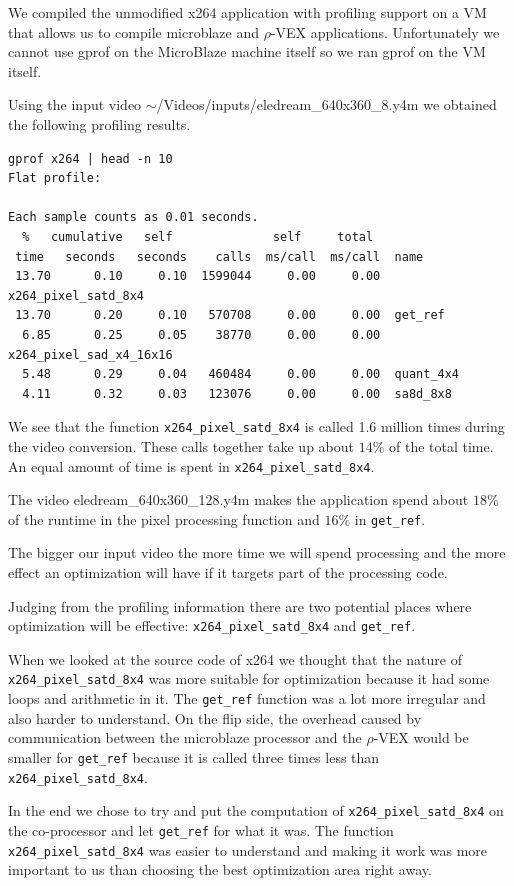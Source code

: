 \documentclass{article}
\newcommand{\rvex}{\ensuremath{\rho}-VEX}
\newcommand{\satd}{\texttt{x264\_pixel\_satd\_8x4}}
\newcommand{\getref}{\texttt{get\_ref}}
\begin{document}
We compiled the unmodified x264 application with profiling support on a VM that
allows us to compile microblaze and \rvex{} applications.
Unfortunately we
cannot use gprof on the MicroBlaze machine itself so we ran gprof on the VM
itself.

Using the input video $\sim$/Videos/inputs/eledream\_640x360\_8.y4m we obtained
the following profiling results.

\begin{small}
\begin{lstlisting}
gprof x264 | head -n 10
Flat profile:

Each sample counts as 0.01 seconds.
  %   cumulative   self              self     total
 time   seconds   seconds    calls  ms/call  ms/call  name
 13.70      0.10     0.10  1599044     0.00     0.00  x264_pixel_satd_8x4
 13.70      0.20     0.10   570708     0.00     0.00  get_ref
  6.85      0.25     0.05    38770     0.00     0.00  x264_pixel_sad_x4_16x16
  5.48      0.29     0.04   460484     0.00     0.00  quant_4x4
  4.11      0.32     0.03   123076     0.00     0.00  sa8d_8x8
\end{lstlisting}\end{small}

We see that the function \satd{} is called 1.6 million times during the video
conversion. These calls together take up about $14\%$ of the total time. An
equal amount of time is spent in \satd{}.

The video eledream\_640x360\_128.y4m makes the application spend about $18\%$
of the runtime in the pixel processing function and $16\%$ in \getref{}.

The bigger our input video the more time we will spend processing and the more
effect an optimization will have if it targets part of the processing code.

Judging from the profiling information there are two potential places where
optimization will be effective: \satd{} and \getref{}.

When we looked at the source code of x264 we thought that the nature of \satd{}
was more suitable for optimization because it had some loops and arithmetic in
it. The \getref{} function was a lot more irregular and also harder to
understand. On the flip side, the overhead caused by communication between the
microblaze processor and the \rvex{} would be smaller for \getref{} because it
is called three times less than \satd{}.

In the end we chose to try and put the computation of \satd{} on the
co-processor and let \getref{} for what it was.  The function \satd{} was
easier to understand and making it work was more important to us than choosing
the best optimization area right away.
\end{document}
